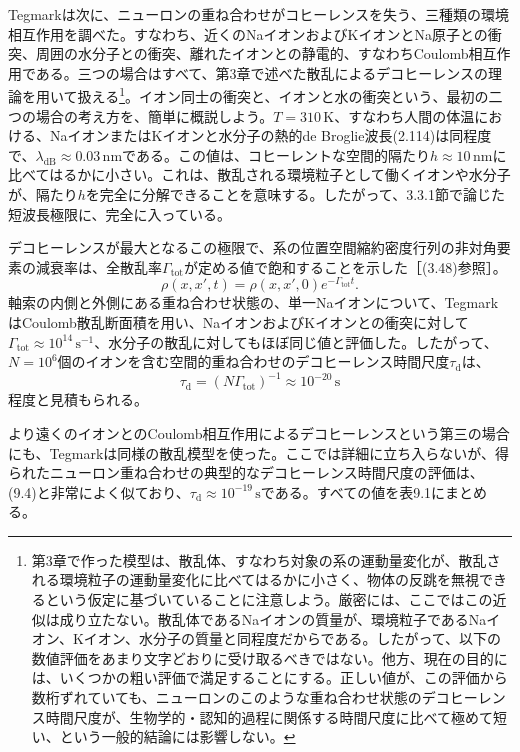 Tegmarkは次に、ニューロンの重ね合わせがコヒーレンスを失う、三種類の環境相互作用を調べた。すなわち、近くのNaイオンおよびKイオンとNa原子との衝突、周囲の水分子との衝突、離れたイオンとの静電的、すなわちCoulomb相互作用である。三つの場合はすべて、第3章で述べた散乱によるデコヒーレンスの理論を用いて扱える\footnote{第3章で作った模型は、散乱体、すなわち対象の系の運動量変化が、散乱される環境粒子の運動量変化に比べてはるかに小さく、物体の反跳を無視できるという仮定に基づいていることに注意しよう。厳密には、ここではこの近似は成り立たない。散乱体であるNaイオンの質量が、環境粒子であるNaイオン、Kイオン、水分子の質量と同程度だからである。したがって、以下の数値評価をあまり文字どおりに受け取るべきではない。他方、現在の目的には、いくつかの粗い評価で満足することにする。正しい値が、この評価から数桁ずれていても、ニューロンのこのような重ね合わせ状態のデコヒーレンス時間尺度が、生物学的・認知的過程に関係する時間尺度に比べて極めて短い、という一般的結論には影響しない。}。イオン同士の衝突と、イオンと水の衝突という、最初の二つの場合の考え方を、簡単に概説しよう。$T=310\,\mathrm K$、すなわち人間の体温における、NaイオンまたはKイオンと水分子の熱的de Broglie波長(2.114)は同程度で、$\lambda_{\mathrm{dB}}\approx0.03\,\mathrm{nm}$である。この値は、コヒーレントな空間的隔たり$h\approx10\,\mathrm{nm}$に比べてはるかに小さい。これは、散乱される環境粒子として働くイオンや水分子が、隔たり$h$を完全に分解できることを意味する。したがって、3.3.1節で論じた短波長極限に、完全に入っている。


\hypertarget{srcpage:370}{}\label{srcpage:370}
デコヒーレンスが最大となるこの極限で、系の位置空間縮約密度行列の非対角要素の減衰率は、全散乱率$\Gamma_{\mathrm{tot}}$が定める値で飽和することを示した［(3.48)参照］。
\begin{equation}
\rho(x,x',t)=\rho(x,x',0)e^{-\Gamma_{\mathrm{tot}}t}.\tag{9.3}
\end{equation}
軸索の内側と外側にある重ね合わせ状態の、単一Naイオンについて、TegmarkはCoulomb散乱断面積を用い、NaイオンおよびKイオンとの衝突に対して$\Gamma_{\mathrm{tot}}\approx10^{14}\,\mathrm{s}^{-1}$、水分子の散乱に対してもほぼ同じ値と評価した。したがって、$N=10^6$個のイオンを含む空間的重ね合わせのデコヒーレンス時間尺度$\tau_{\mathrm d}$は、
\begin{equation}
\tau_{\mathrm d}=(N\Gamma_{\mathrm{tot}})^{-1}\approx10^{-20}\,\mathrm s\tag{9.4}
\end{equation}
程度と見積もられる。

より遠くのイオンとのCoulomb相互作用によるデコヒーレンスという第三の場合にも、Tegmarkは同様の散乱模型を使った。ここでは詳細に立ち入らないが、得られたニューロン重ね合わせの典型的なデコヒーレンス時間尺度の評価は、(9.4)と非常によく似ており、$\tau_{\mathrm d}\approx10^{-19}\,\mathrm s$である。すべての値を表9.1にまとめる。

